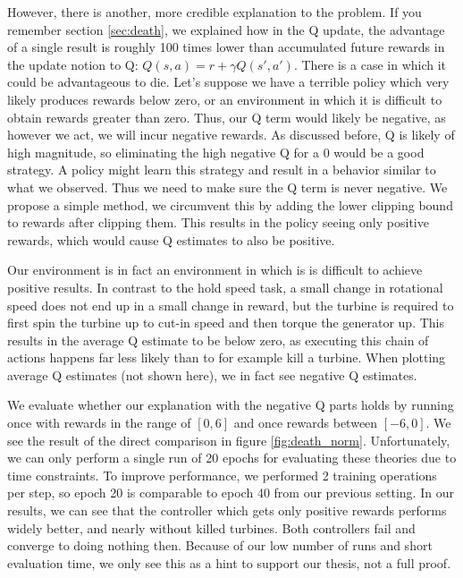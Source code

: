 \documentclass[hyperref,final,beleg]{cgvpub}
\begin{document}
However, there is another, more credible explanation to the problem. If you remember section \ref{sec:death}, we explained how in the Q update, the advantage of a single result is roughly 100 times lower than accumulated future rewards in the update notion to Q: $Q(s, a) = r + \gamma Q(s', a')$. There is a case in which it could be advantageous to die. Let's suppose we have a terrible policy which very likely produces rewards below zero, or an environment in which it is difficult to obtain rewards greater than zero. Thus, our Q term would likely be negative, as however we act, we will incur negative rewards. As discussed before, Q is likely of high magnitude, so eliminating the high negative Q for a 0 would be a good strategy. A policy might learn this strategy and result in a behavior similar to what we observed. Thus we need to make sure the Q term is never negative. We propose a simple method, we circumvent this by adding the lower clipping bound to rewards after clipping them. This results in the policy seeing only positive rewards, which would cause Q estimates to also be positive.

Our environment is in fact an environment in which is is difficult to achieve positive results. In contrast to the hold speed task, a small change in rotational speed does not end up in a small change in reward, but the turbine is required to first spin the turbine up to cut-in speed and then torque the generator up. This results in the average Q estimate to be below zero, as executing this chain of actions happens far less likely than to for example kill a turbine. When plotting average Q estimates (not shown here), we in fact see negative Q estimates.

We evaluate whether our explanation with the negative Q parts holds by running once with rewards in the range of $[0, 6]$ and once rewards between $[-6, 0]$. We see the result of the direct comparison in figure \ref{fig:death_norm}. Unfortunately, we can only perform a single run of 20 epochs for evaluating these theories due to time constraints. To improve performance, we performed 2 training operations per step, so epoch 20 is comparable to epoch 40 from our previous setting. In our results, we can see that the controller which gets only positive rewards performs widely better, and nearly without killed turbines. Both controllers fail and converge to doing nothing then. Because of our low number of runs and short evaluation time, we only see this as a hint to support our thesis, not a full proof.
\end{document}
